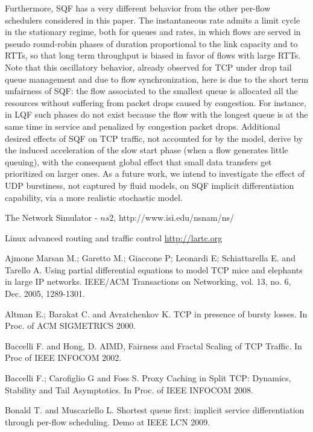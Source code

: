 \documentclass[a4paper,oneside, 11pt]{article}
\begin{document}
Furthermore,
SQF has a very different behavior from the other per-flow schedulers considered in this paper.
The instantaneous rate admits a limit cycle in the stationary regime, both for queues and rates,
in which flows are served in pseudo round-robin phases of duration proportional to the link capacity and to RTTs, so that long term throughput is biased in favor of flows with large RTTs.
Note that this oscillatory behavior, already observed for TCP under drop tail queue management and due to flow synchronization, here is due to the short term unfairness of SQF: the flow associated to the smallest queue is allocated
all the resources without suffering from  packet drops caused by congestion.
For instance, in LQF such phases do not exist because the flow with the longest queue is at the same time in service and penalized by
congestion packet drops.
Additional desired effects of SQF on TCP traffic, not accounted for by the model, derive
by the induced acceleration of the slow start phase (when a flow generates little queuing),
with the consequent global effect that small data transfers get prioritized on larger ones.
As a future work, we intend to investigate the effect of UDP burstiness, not captured by fluid models, on SQF implicit differentiation
capability, via a more realistic stochastic model.


The Network Simulator - $ns2$,
http://www.isi.edu/nsnam/ns/

Linux advanced routing and traffic control \url{http://lartc.org}

Ajmone Marsan M.;  Garetto M.; Giaccone P; Leonardi E;  Schiattarella E. and Tarello A.
Using partial differential equations to model TCP mice and elephants in large IP networks.
IEEE/ACM Transactions on Networking, vol. 13, no. 6, Dec. 2005, 1289-1301.

Altman E.; Barakat C. and Avratchenkov K.
TCP in presence of bursty losses.
In Proc. of ACM SIGMETRICS 2000.

Baccelli F. and Hong, D.
AIMD, Fairness and Fractal Scaling of TCP Traffic.	
In Proc of IEEE INFOCOM 2002.

Baccelli F.; Carofiglio G and Foss S.
Proxy Caching in Split TCP: Dynamics, Stability and Tail Asymptotics.
In Proc. of IEEE INFOCOM 2008.

Bonald T. and Muscariello L.
Shortest queue first: implicit service differentiation through per-flow scheduling.
Demo at IEEE LCN 2009.
\end{document}

